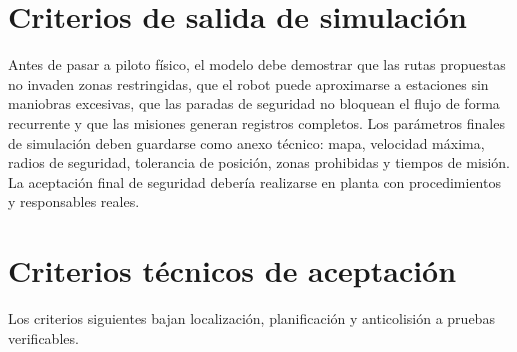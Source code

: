 \section{Criterios de salida de simulación}

Antes de pasar a piloto físico, el modelo debe demostrar que las rutas propuestas no invaden zonas restringidas, que el robot puede aproximarse a estaciones sin maniobras excesivas, que las paradas de seguridad no bloquean el flujo de forma recurrente y que las misiones generan registros completos. Los parámetros finales de simulación deben guardarse como anexo técnico: mapa, velocidad máxima, radios de seguridad, tolerancia de posición, zonas prohibidas y tiempos de misión. La aceptación final de seguridad debería realizarse en planta con procedimientos y responsables reales.

\section{Criterios técnicos de aceptación}

Los criterios siguientes bajan localización, planificación y anticolisión a pruebas verificables.

